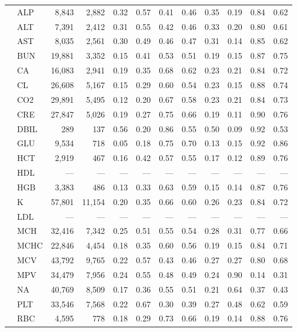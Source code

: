 \begin{table}[ht]
\begin{tabular}{llrrrrrrrrrr}
 & ALP & 8,843 & 2,882 & 0.32 & 0.57 & 0.41 & 0.46 & 0.35 & 0.19 & 0.84 & 0.62 \\
 & ALT & 7,391 & 2,412 & 0.31 & 0.55 & 0.42 & 0.46 & 0.33 & 0.20 & 0.80 & 0.61 \\
 & AST & 8,035 & 2,561 & 0.30 & 0.49 & 0.46 & 0.47 & 0.31 & 0.14 & 0.85 & 0.62 \\
 & BUN & 19,881 & 3,352 & 0.15 & 0.41 & 0.53 & 0.51 & 0.19 & 0.15 & 0.87 & 0.75 \\
 & CA & 16,083 & 2,941 & 0.19 & 0.35 & 0.68 & 0.62 & 0.23 & 0.21 & 0.84 & 0.72 \\
 & CL & 26,608 & 5,167 & 0.15 & 0.29 & 0.60 & 0.54 & 0.23 & 0.15 & 0.88 & 0.74 \\
 & CO2 & 29,891 & 5,495 & 0.12 & 0.20 & 0.67 & 0.58 & 0.23 & 0.21 & 0.84 & 0.73 \\
 & CRE & 27,847 & 5,026 & 0.19 & 0.27 & 0.75 & 0.66 & 0.19 & 0.11 & 0.90 & 0.76 \\
 & DBIL & 289 & 137 & 0.56 & 0.20 & 0.86 & 0.55 & 0.50 & 0.09 & 0.92 & 0.53 \\
 & GLU & 9,534 & 718 & 0.05 & 0.18 & 0.75 & 0.70 & 0.13 & 0.15 & 0.92 & 0.86 \\
 & HCT & 2,919 & 467 & 0.16 & 0.42 & 0.57 & 0.55 & 0.17 & 0.12 & 0.89 & 0.76 \\
 & HDL & --- & --- & --- & --- & --- & --- & --- & --- & --- & --- \\
 & HGB & 3,383 & 486 & 0.13 & 0.33 & 0.63 & 0.59 & 0.15 & 0.14 & 0.87 & 0.76 \\
 & K & 57,801 & 11,154 & 0.20 & 0.35 & 0.66 & 0.60 & 0.26 & 0.23 & 0.84 & 0.72 \\
 & LDL & --- & --- & --- & --- & --- & --- & --- & --- & --- & --- \\
 & MCH & 32,416 & 7,342 & 0.25 & 0.51 & 0.55 & 0.54 & 0.28 & 0.31 & 0.77 & 0.66 \\
 & MCHC & 22,846 & 4,454 & 0.18 & 0.35 & 0.60 & 0.56 & 0.19 & 0.15 & 0.84 & 0.71 \\
 & MCV & 43,792 & 9,765 & 0.22 & 0.57 & 0.43 & 0.46 & 0.27 & 0.27 & 0.80 & 0.68 \\
 & MPV & 34,479 & 7,956 & 0.24 & 0.55 & 0.48 & 0.49 & 0.24 & 0.90 & 0.14 & 0.31 \\
 & NA & 40,769 & 8,509 & 0.17 & 0.36 & 0.55 & 0.51 & 0.21 & 0.64 & 0.37 & 0.43 \\
 & PLT & 33,546 & 7,568 & 0.22 & 0.67 & 0.30 & 0.39 & 0.27 & 0.48 & 0.62 & 0.59 \\
 & RBC & 4,595 & 778 & 0.18 & 0.29 & 0.73 & 0.66 & 0.19 & 0.14 & 0.88 & 0.76 \\

\end{tabular}
\end{table}
